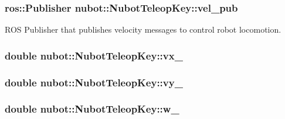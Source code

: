 \hypertarget{classnubot_1_1NubotTeleopKey_af2b940ed562da027c7eda729403e4f86}{
\subsubsection[{vel\-\_\-pub}]{\setlength{\rightskip}{0pt plus 5cm}ros\-::\-Publisher nubot\-::\-Nubot\-Teleop\-Key\-::vel\-\_\-pub\hspace{0.3cm}{\ttfamily [private]}}}\label{classnubot_1_1NubotTeleopKey_af2b940ed562da027c7eda729403e4f86}


R\-O\-S Publisher that publishes velocity messages to control robot locomotion. 

\hypertarget{classnubot_1_1NubotTeleopKey_aafe296ec15a99f249180144842c64b29}{
\subsubsection[{vx\-\_\-}]{\setlength{\rightskip}{0pt plus 5cm}double nubot\-::\-Nubot\-Teleop\-Key\-::vx\-\_\-\hspace{0.3cm}{\ttfamily [private]}}}\label{classnubot_1_1NubotTeleopKey_aafe296ec15a99f249180144842c64b29}
\hypertarget{classnubot_1_1NubotTeleopKey_a9bd6bb13fc993a07fb3d2272d3e2a600}{
\subsubsection[{vy\-\_\-}]{\setlength{\rightskip}{0pt plus 5cm}double nubot\-::\-Nubot\-Teleop\-Key\-::vy\-\_\-\hspace{0.3cm}{\ttfamily [private]}}}\label{classnubot_1_1NubotTeleopKey_a9bd6bb13fc993a07fb3d2272d3e2a600}
\hypertarget{classnubot_1_1NubotTeleopKey_a40143b187fb9f6278b0c2847acd3d756}{
\subsubsection[{w\-\_\-}]{\setlength{\rightskip}{0pt plus 5cm}double nubot\-::\-Nubot\-Teleop\-Key\-::w\-\_\-\hspace{0.3cm}{\ttfamily [private]}}}\label{classnubot_1_1NubotTeleopKey_a40143b187fb9f6278b0c2847acd3d756}


